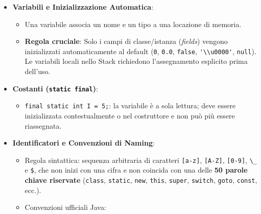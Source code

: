 \documentclass[11pt,a4paper]{article}
\newcommand{\passthrough}[1]{#1}
\providecommand{\tightlist}{\setlength{\itemsep}{0pt}\setlength{\parskip}{0pt}}
\begin{document}
\begin{itemize}
\tightlist
\item
  \textbf{Variabili e Inizializzazione Automatica}:

  \begin{itemize}
  \tightlist
  \item
    Una variabile associa un nome e un tipo a una locazione di memoria.
  \item
    \textbf{Regola cruciale}: Solo i campi di classe/istanza
    (\emph{fields}) vengono inizializzati automaticamente al default
    (\passthrough{\lstinline!0!}, \passthrough{\lstinline!0.0!},
    \passthrough{\lstinline!false!},
    \passthrough{\lstinline!'\\u0000'!},
    \passthrough{\lstinline!null!}). Le variabili locali nello Stack
    richiedono l'assegnamento esplicito prima dell'uso.
  \end{itemize}
\item
  \textbf{Costanti (\passthrough{\lstinline!static final!})}:

  \begin{itemize}
  \tightlist
  \item
    \passthrough{\lstinline!final static int I = 5;!}: la variabile è a
    sola lettura; deve essere inizializzata contestualmente o nel
    costruttore e non può più essere riassegnata.
  \end{itemize}
\item
  \textbf{Identificatori e Convenzioni di Naming}:

  \begin{itemize}
  \tightlist
  \item
    Regola sintattica: sequenza arbitraria di caratteri
    \passthrough{\lstinline![a-z]!}, \passthrough{\lstinline![A-Z]!},
    \passthrough{\lstinline![0-9]!}, \passthrough{\lstinline!\_!} e
    \passthrough{\lstinline!$!}, che non inizi con una cifra e non
    coincida con una delle \textbf{50 parole chiave riservate}
    (\passthrough{\lstinline!class!}, \passthrough{\lstinline!static!},
    \passthrough{\lstinline!new!}, \passthrough{\lstinline!this!},
    \passthrough{\lstinline!super!}, \passthrough{\lstinline!switch!},
    \passthrough{\lstinline!goto!}, \passthrough{\lstinline!const!},
    ecc.).
  \item
    Convenzioni ufficiali Java:


\end{itemize}
\end{itemize}
\end{document}
